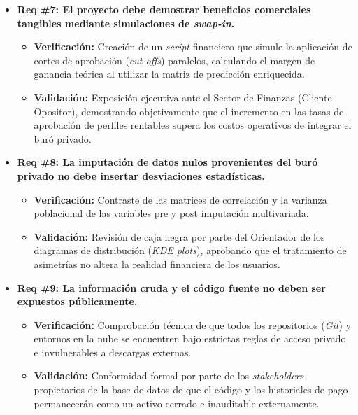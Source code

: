 \documentclass[
11pt, %
]{charter}
\begin{document}
\begin{itemize}
    \item \textbf{Req \#7: El proyecto debe demostrar beneficios comerciales tangibles mediante simulaciones de \textit{swap-in}.}
    \begin{itemize}
        \item \textbf{Verificación:} Creación de un \textit{script} financiero que simule la aplicación de cortes de aprobación (\textit{cut-offs}) paralelos, calculando el margen de ganancia teórica al utilizar la matriz de predicción enriquecida.
        \item \textbf{Validación:} Exposición ejecutiva ante el Sector de Finanzas (Cliente Opositor), demostrando objetivamente que el incremento en las tasas de aprobación de perfiles rentables supera los costos operativos de integrar el buró privado.
    \end{itemize}

    \item \textbf{Req \#8: La imputación de datos nulos provenientes del buró privado no debe insertar desviaciones estadísticas.}
    \begin{itemize}
        \item \textbf{Verificación:} Contraste de las matrices de correlación y la varianza poblacional de las variables pre y post imputación multivariada.
        \item \textbf{Validación:} Revisión de caja negra por parte del Orientador de los diagramas de distribución (\textit{KDE plots}), aprobando que el tratamiento de asimetrías no altera la realidad financiera de los usuarios.
    \end{itemize}

    \item \textbf{Req \#9: La información cruda y el código fuente no deben ser expuestos públicamente.}
    \begin{itemize}
        \item \textbf{Verificación:} Comprobación técnica de que todos los repositorios (\textit{Git}) y entornos en la nube se encuentren bajo estrictas reglas de acceso privado e invulnerables a descargas externas.
        \item \textbf{Validación:} Conformidad formal por parte de los \textit{stakeholders} propietarios de la base de datos de que el código y los historiales de pago permanecerán como un activo cerrado e inauditable externamente.
    \end{itemize}


\end{itemize}
\end{document}
